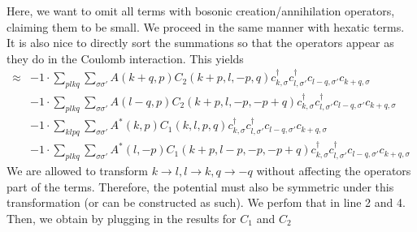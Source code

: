 Here, we want to omit all terms with bosonic creation/annihilation operators, claiming them to be small. We proceed in the same manner with hexatic terms.
It is also nice to directly sort the summations so that the operators appear as they do in the Coulomb interaction. This yields
\begin{align*}
	[\eta, H'] \approx 	&-1 \cdot \sum_{ p l k q } \sum_{ \sigma \sigma' } A( k+q, p )  C_2( k+p, l, -p, q )   c_{ k, \sigma }^\dagger  c_{ l, \sigma' }^\dagger  c_{ l-q, \sigma' } c_{ k+q, \sigma }  \\
	&-1 \cdot \sum_{ p l k q } \sum_{ \sigma \sigma' } A( l-q, p )  C_2( k+p, l, -p, -p+q )   c_{ k, \sigma }^\dagger  c_{ l, \sigma' }^\dagger  c_{ l-q, \sigma' } c_{ k+q, \sigma }  \\
	&-1 \cdot \sum_{ k l p q } \sum_{ \sigma \sigma' } A^*( k, p )  C_1( k, l, p, q )   c_{ k, \sigma }^\dagger  c_{ l, \sigma' }^\dagger  c_{ l-q, \sigma' } c_{ k+q, \sigma }  \\
	&-1 \cdot \sum_{ p l k q } \sum_{ \sigma \sigma' } A^*( l, -p )  C_1( k+p, l-p, -p, -p+q )   c_{ k, \sigma }^\dagger  c_{ l, \sigma' }^\dagger  c_{ l-q, \sigma' } c_{ k+q, \sigma } 
\end{align*}
\newpage
We are allowed to transform $k \to l, l \to k, q \to -q$ without affecting the operators part of the terms. Therefore, the potential must also be symmetric under this transformation (or can be constructed as such). We perfom that in line 2 and 4. Then, we obtain by plugging in the results for $C_1$ and $C_2$
